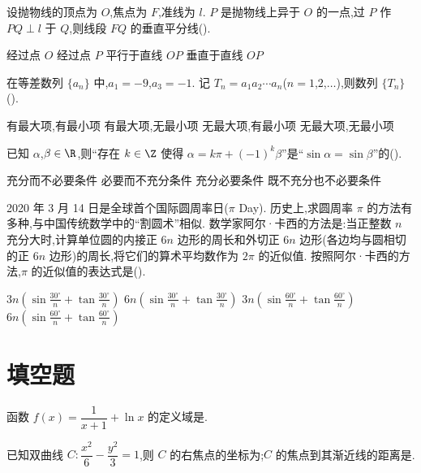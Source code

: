 \begin{problem}
设抛物线的顶点为 \(O\),焦点为 \(F\),准线为 \(l\). \(P\) 是抛物线上异于 \(O\) 的一点,过 \(P\) 作 \(PQ\perp l\) 于 \(Q\),则线段 \(FQ\) 的垂直平分线(\quad).

\choices
    {经过点 \(O\)}
    {经过点 \(P\)}
    {平行于直线 \(OP\)}
    {垂直于直线 \(OP\)}
\end{problem}

\begin{problem}
在等差数列 \(\{a_n\}\) 中,\(a_1=-9\),\(a_3=-1\). 记 \(T_n=a_1a_2\cdots a_n\)(\(n=1\),\(2\),\(\dots\)),则数列 \(\{T_n\}\)(\quad).

\choices
    {有最大项,有最小项}
    {有最大项,无最小项}
    {无最大项,有最小项}
    {无最大项,无最小项}
\end{problem}

\begin{problem}
已知 \(\alpha\),\(\beta\in\R\),则``存在 \(k\in\Z\) 使得 \(\alpha=k\pi+(-1)^k\beta\)''是``\(\sin\alpha=\sin\beta\)''的(\quad).

\choices
    {充分而不必要条件}
    {必要而不充分条件}
    {充分必要条件}
    {既不充分也不必要条件}
\end{problem}

\begin{problem}
2020 年 3 月 14 日是全球首个国际圆周率日(\(\pi\) Day). 历史上,求圆周率 \(\pi\) 的方法有多种,与中国传统数学中的``割圆术''相似. 数学家阿尔·卡西的方法是:当正整数 \(n\) 充分大时,计算单位圆的内接正 \(6n\) 边形的周长和外切正 \(6n\) 边形(各边均与圆相切的正 \(6n\) 边形)的周长,将它们的算术平均数作为 \(2\pi\) 的近似值. 按照阿尔·卡西的方法,\(\pi\) 的近似值的表达式是(\quad).

\choices
    {\(3n\left(\sin\frac{30^\circ}{n}+\tan\frac{30^\circ}{n}\right)\)}
    {\(6n\left(\sin\frac{30^\circ}{n}+\tan\frac{30^\circ}{n}\right)\)}
    {\(3n\left(\sin\frac{60^\circ}{n}+\tan\frac{60^\circ}{n}\right)\)}
    {\(6n\left(\sin\frac{60^\circ}{n}+\tan\frac{60^\circ}{n}\right)\)}
\end{problem}

\section{填空题}

\begin{problem}
函数 \(f(x)=\dfrac{1}{x+1}+\ln x\) 的定义域是\fillinblank{}.
\end{problem}

\begin{problem}
已知双曲线 \(C:\dfrac{x^2}{6}-\dfrac{y^2}{3}=1\),则 \(C\) 的右焦点的坐标为\fillinblank{};\(C\) 的焦点到其渐近线的距离是\fillinblank{}.
\end{problem}

